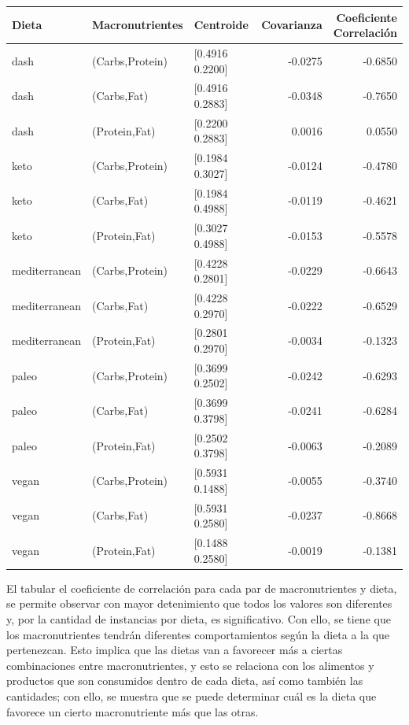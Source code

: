 \documentclass[12pt,a4paper]{article}
\begin{document}
{        \begin{center}
            \begin{tabular}{lllrr}
            \toprule
                Dieta & Macronutrientes & Centroide & Covarianza & \makecell{Coeficiente\\Correlación} \\
            \midrule
                dash          & (Carbs,Protein) & [0.4916 0.2200] & -0.0275 & -0.6850 \\
                dash          & (Carbs,Fat)     & [0.4916 0.2883] & -0.0348 & -0.7650 \\
                dash          & (Protein,Fat)   & [0.2200 0.2883] &  0.0016 &  0.0550 \\
                keto          & (Carbs,Protein) & [0.1984 0.3027] & -0.0124 & -0.4780 \\
                keto          & (Carbs,Fat)     & [0.1984 0.4988] & -0.0119 & -0.4621 \\
                keto          & (Protein,Fat)   & [0.3027 0.4988] & -0.0153 & -0.5578 \\
                mediterranean & (Carbs,Protein) & [0.4228 0.2801] & -0.0229 & -0.6643 \\
                mediterranean & (Carbs,Fat)     & [0.4228 0.2970] & -0.0222 & -0.6529 \\
                mediterranean & (Protein,Fat)   & [0.2801 0.2970] & -0.0034 & -0.1323 \\
                paleo         & (Carbs,Protein) & [0.3699 0.2502] & -0.0242 & -0.6293 \\
                paleo         & (Carbs,Fat)     & [0.3699 0.3798] & -0.0241 & -0.6284 \\
                paleo         & (Protein,Fat)   & [0.2502 0.3798] & -0.0063 & -0.2089 \\
                vegan         & (Carbs,Protein) & [0.5931 0.1488] & -0.0055 & -0.3740 \\
                vegan         & (Carbs,Fat)     & [0.5931 0.2580] & -0.0237 & -0.8668 \\
                vegan         & (Protein,Fat)   & [0.1488 0.2580] & -0.0019 & -0.1381 \\
            \bottomrule
            \end{tabular}
        \end{center}
        
        El tabular el coeficiente de correlación para cada par de macronutrientes y dieta, 
        se permite observar con mayor detenimiento que todos los valores son diferentes y,  
        por la cantidad de instancias por dieta, es significativo. Con ello, se tiene que 
        los macronutrientes tendrán diferentes comportamientos según la dieta a la que 
        pertenezcan. Esto implica que las dietas van a favorecer más a ciertas combinaciones 
        entre macronutrientes, y esto se relaciona con los alimentos y productos que son 
        consumidos dentro de cada dieta, así como también las cantidades; con ello, se 
        muestra que se puede determinar cuál es la dieta que favorece un cierto macronutriente 
        más que las otras.
    }
\end{document}
